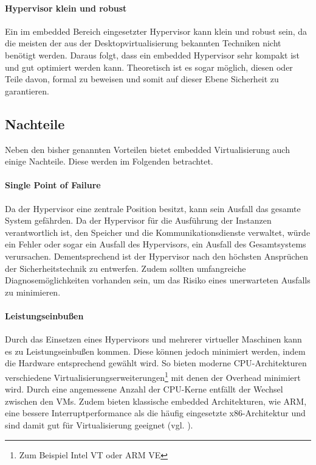 \documentclass[
  a4paper,					    %
  twoside,
  DIV=calc,     				%
  bibliography=totoc,
  cleardoublepage=empty,
  ngerman,     					%
  final       					%
]{scrbook}
\begin{document}
\paragraph{Hypervisor klein und robust}
Ein im embedded Bereich eingesetzter Hypervisor kann klein und robust sein, da die meisten der aus der Desktopvirtualisierung bekannten Techniken nicht benötigt werden. Daraus folgt, dass ein embedded Hypervisor sehr kompakt ist und gut optimiert werden kann. Theoretisch ist es sogar möglich, diesen oder Teile davon, formal zu beweisen und somit auf dieser Ebene Sicherheit zu garantieren.

\subsection{Nachteile}
Neben den bisher genannten Vorteilen bietet embedded Virtualisierung auch einige Nachteile. Diese werden im Folgenden betrachtet.

\paragraph{Single Point of Failure}
Da der Hypervisor eine zentrale Position besitzt, kann sein Ausfall das gesamte System gefährden. Da der Hypervisor für die Ausführung der Instanzen verantwortlich ist, den Speicher und die Kommunikationsdienste verwaltet, würde ein Fehler oder sogar ein Ausfall des Hypervisors, ein Ausfall des Gesamtsystems verursachen. Dementsprechend ist der Hypervisor nach den höchsten Ansprüchen der Sicherheitstechnik zu entwerfen. Zudem sollten umfangreiche Diagnosemöglichkeiten vorhanden sein, um das Risiko eines unerwarteten Ausfalls zu minimieren.

\paragraph{Leistungseinbußen}
Durch das Einsetzen eines Hypervisors und mehrerer virtueller Maschinen kann es zu Leistungseinbußen kommen. Diese können jedoch minimiert werden, indem die Hardware entsprechend gewählt wird. So bieten moderne CPU-Architekturen verschiedene Virtualisierungserweiterungen\footnote{Zum Beispiel Intel VT oder ARM VE} mit denen der Overhead minimiert wird. Durch eine angemessene Anzahl der CPU-Kerne entfällt der Wechsel zwischen den VMs. Zudem bieten klassische embedded Architekturen, wie ARM, eine bessere Interruptperformance als die häufig eingesetzte x86-Architektur und sind damit gut für Virtualisierung geeignet (vgl. \cite{okl4}).
\end{document}
